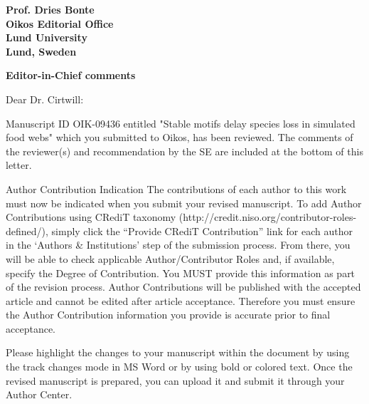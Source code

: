 \documentclass[12pt]{letter}
\begin{document}
\begin{letter}{\bf Prof. Dries Bonte\\
Oikos Editorial Office \\
Lund University \\
Lund, Sweden}










{\large \textbf{Editor-in-Chief comments}}

Dear Dr. Cirtwill:

Manuscript ID OIK-09436 entitled "Stable motifs delay species loss in simulated food webs" which you submitted to Oikos, has been reviewed.  The comments of the reviewer(s) and recommendation by the SE are included at the bottom of this letter.


Author Contribution Indication
The contributions of each author to this work must now be indicated when you submit your revised manuscript. To add Author Contributions using CRediT taxonomy (http://credit.niso.org/contributor-roles-defined/), simply click the “Provide CRediT Contribution” link for each author in the ‘Authors \& Institutions’ step of the submission process. From there, you will be able to check applicable Author/Contributor Roles and, if available, specify the Degree of Contribution. You MUST provide this information as part of the revision process. Author Contributions will be published with the accepted article and cannot be edited after article acceptance. Therefore you must ensure the Author Contribution information you provide is accurate prior to final acceptance.


Please highlight the changes to your manuscript within the document by using the track changes mode in MS Word or by using bold or colored text. Once the revised manuscript is prepared, you can upload it and submit it through your Author Center.



\end{letter}
\end{document}
